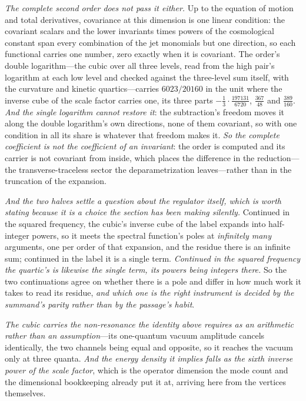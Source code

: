 \documentclass[11pt,a4paper]{article}
\theoremstyle{plain}
\theoremstyle{definition}
\theoremstyle{remark}
\begin{document}
\emph{The complete second order does not pass it either.} Up to the equation of motion and total derivatives,
covariance at this dimension is one linear condition: the covariant scalars and the lower invariants times powers
of the cosmological constant span every combination of the jet monomials but one direction, so each functional
carries one number, zero exactly when it is covariant. The order's double logarithm---the cubic over all three
levels, read from the high pair's logarithm at each low level and checked against the three-level sum itself, with
the curvature and kinetic quartics---carries $6023/20160$ in the unit where the inverse cube of the scale factor
carries one, its three parts $-\tfrac13\cdot\tfrac{197131}{6720}$, $\tfrac{367}{48}$ and $\tfrac{389}{160}$. \emph{And the
single logarithm cannot restore it}: the subtraction's freedom moves it along the double logarithm's own
directions, none of them covariant, so with one condition in all its share is whatever that freedom makes it.
\emph{So the complete coefficient is not the coefficient of an invariant}: the order is computed and its carrier
is not covariant from inside, which places the difference in the reduction---the transverse-traceless sector the
deparametrization leaves---rather than in the truncation of the
expansion.

\emph{And the two halves settle a question about the regulator itself, which is worth stating because it is a
choice the section has been making silently.} Continued in the squared frequency, the cubic's inverse cube of the
label expands into half-integer powers, so it meets the spectral function's poles at \emph{infinitely many}
arguments, one per order of that expansion, and the residue there is an infinite sum; continued in the label it is
a single term. \emph{Continued in the squared frequency the quartic's is likewise the single term, its powers
being integers there.} So the two continuations agree on whether there is a pole and differ in how much work it
takes to read its residue, \emph{and which one is the right instrument is decided by the summand's parity rather
than by the passage's
habit}.

\emph{The cubic carries the non-resonance the identity above requires
as an arithmetic rather than an assumption}---its one-quantum vacuum amplitude cancels identically, the two
channels being equal and opposite, so it reaches the vacuum only at three quanta. \emph{And the energy density
it implies falls as the sixth inverse power of the scale factor}, which is the operator dimension the mode count
and the dimensional bookkeeping already put it at, arriving here from the vertices
themselves.
\end{document}
